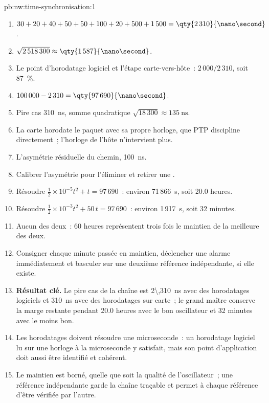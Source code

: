\begin{solution}{pb:nw:time-synchronisation:1}
\begin{enumerate}
\item $30 + 20 + 40 + 50 + 50 + 100 + 20 + 500 + 1\,500 = \qty{2\,310}{\nano\second}$.
\item $\sqrt{2\,518\,300} \approx \qty{1\,587}{\nano\second}$.
\item Le point d'horodatage logiciel et l'étape carte-vers-hôte~: $2\,000/2\,310$, soit 87~\%.
\item $100\,000 - 2\,310 = \qty{97\,690}{\nano\second}$.
\item Pire cas \qty{310}{\nano\second}, somme quadratique $\sqrt{18\,300} \approx \qty{135}{\nano\second}$.
\item La carte horodate le paquet avec sa propre horloge, que PTP discipline directement~; l'horloge de l'hôte n'intervient plus.
\item L'asymétrie résiduelle du chemin, \qty{100}{\nano\second}.
\item Calibrer l'asymétrie pour l'éliminer et retirer une .
\item Résoudre $\tfrac12 \times 10^{-5} t^2 + t = 97\,690$~: environ 71\,866~s, soit 20.0 heures.
\item Résoudre $\tfrac12 \times 10^{-3} t^2 + 50\,t = 97\,690$~: environ 1\,917~s, soit 32 minutes.
\item Aucun des deux~: 60 heures représentent trois fois le maintien de la meilleure des deux.
\item Consigner chaque minute passée en maintien, déclencher une alarme immédiatement et basculer sur une deuxième référence indépendante, si elle existe.
\item \textbf{Résultat clé.} Le pire cas de la chaîne est \qty{2\,310}{\nano\second} avec des horodatages logiciels et \qty{310}{\nano\second} avec
  des horodatages sur carte~; le grand maître conserve la marge restante pendant 20.0 heures avec le bon oscillateur et 32 minutes avec le moins bon.
\item Les horodatages doivent résoudre une microseconde~: un horodatage logiciel lu sur une horloge à la microseconde y satisfait, mais son point
  d'application doit aussi être identifié et cohérent.
\item Le maintien est borné, quelle que soit la qualité de l'oscillateur~; une référence indépendante garde la chaîne traçable et permet à chaque référence d'être
  vérifiée par l'autre.

\end{enumerate}
\end{solution}
